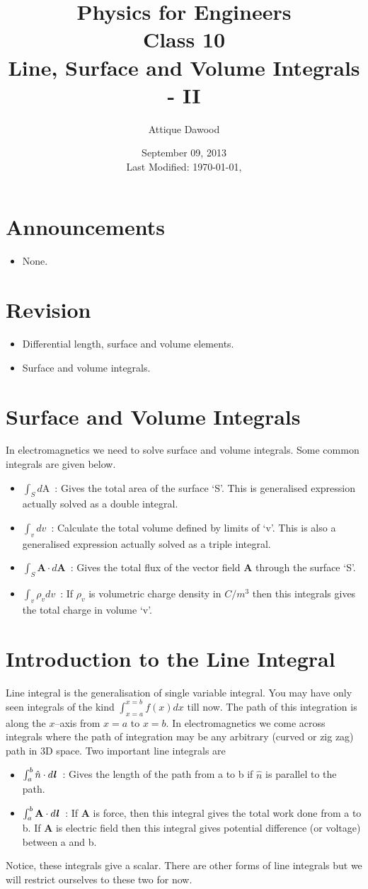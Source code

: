\documentclass[12pt,a4paper]{article}
\title{\vspace{-2cm}Physics for Engineers\\Class 10\\Line, Surface and Volume Integrals - II}
\author{Attique Dawood}
\date{September 09, 2013\\[0.2cm] Last Modified: \today, \currenttime}
\begin{document}
\maketitle
\section{Announcements}
\begin{itemize}
\item None.
\end{itemize}
\section{Revision}
\begin{itemize}
\item Differential length, surface and volume elements.
\item Surface and volume integrals.
\end{itemize}
\section{Surface and Volume Integrals}
In electromagnetics we need to solve surface and volume integrals. Some common integrals are given below.
\begin{itemize}
\item $\int_{S} d\mathrm{A}$~: Gives the total area of the surface `S'. This is generalised expression actually solved as a double integral.
\item $\int_{v} dv$~: Calculate the total volume defined by limits of `v'. This is also a generalised expression actually solved as a triple integral.
\item $\int_{S}\textbf{A}\cdot d\textbf{A}$~: Gives the total flux of the vector field \textbf{A} through the surface `S'.
\item $\int_{v}\rho_v dv$~: If $\rho_v$ is volumetric charge density in $C/m^3$ then this integrals gives the total charge in volume `v'.
\end{itemize}
\section{Introduction to the Line Integral}
Line integral is the generalisation of single variable integral. You may have only seen integrals of the kind $\int_{x=a}^{x=b} f(x)dx$ till now. The path of this integration is along the $x$--axis from $x=a$ to $x=b$. In electromagnetics we come across integrals where the path of integration may be any arbitrary (curved or zig zag) path in 3D space. Two important line integrals are
\begin{itemize}
\item $\int_{a}^{b}\hat n\cdot d\textbf{\textit{l}}$~: Gives the length of the path from a to b if $\hat n$ is parallel to the path.
\item $\int_{a}^{b}\textbf{A}\cdot d\textbf{\textit{l}}$~: If \textbf{A} is force, then this integral gives the total work done from a to b. If \textbf{A} is electric field then this integral gives potential difference (or voltage) between a and b.
\end{itemize}
Notice, these integrals give a scalar. There are other forms of line integrals but we will restrict ourselves to these two for now.
\end{document}
